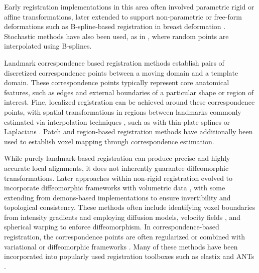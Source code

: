 \documentclass[lettersize,journal]{IEEEtran}
\begin{document}
Early registration implementations in this area often involved parametric rigid or affine transformations, later extended to support non-parametric or free-form deformations such as B-spline-based registration in breast deformation \cite{Rueckert1999}. Stochastic methods have also been used, as in \cite{Tustison2009}, where random points are interpolated using B-splines. 

Landmark correspondence based registration methods \cite{MAINTZ19981, ZITOVA2003977} 
establish pairs of discretized correspondence points between a moving domain and a template domain. 
These correspondence points typically represent core anatomical features, such as edges and external boundaries of a particular shape or region of interest. Fine, localized registration can be achieved around these correspondence points, with spatial transformations in regions between landmarks commonly estimated via interpolation techniques \cite{ALLASIA20141}, such as with thin-plate splines \cite{Sun2011} or Laplacians \cite{AgarwalRobustRegistration, AgarwalXG16, AGARWAL201845, RegBoost2025}. Patch \cite{PatchBasedRegistration} and region-based registration \cite{Ourselin2000BlockMA} methods have additionally been used to establish voxel mapping through correspondence estimation. 

While purely landmark-based registration can produce precise and highly accurate local alignments, it does not inherently guarantee diffeomorphic transformations. Later approaches within non-rigid registration evolved to incorporate diffeomorphic frameworks with volumetric data \cite{Beg2005}, with some extending from demons-based implementations \cite{THIRION1998243} to ensure invertibility and topological consistency. These methods often include identifying voxel boundaries from intensity gradients and employing diffusion models, velocity fields \cite{VERCAUTEREN2009S61}, and spherical warping \cite{sphericaldemons} to enforce diffeomorphism. 
In correspondence-based registration, the correspondence points are often regularized \cite{Shusharina2012-ez} or combined with variational or diffeomorphic frameworks \cite{ASHBURNER200795, AVANTS200826, VERCAUTEREN2009S61}. Many of these methods have been incorporated into popularly used registration toolboxes such as elastix \cite{Klein2010elastixAT} and ANTs \cite{AVANTS200826}. 
\end{document}
